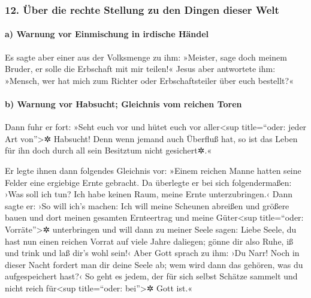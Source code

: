 \hypertarget{uxfcber-die-rechte-stellung-zu-den-dingen-dieser-welt}{%
\subsubsection{12. Über die rechte Stellung zu den Dingen dieser
Welt}\label{uxfcber-die-rechte-stellung-zu-den-dingen-dieser-welt}}

\hypertarget{a-warnung-vor-einmischung-in-irdische-huxe4ndel}{%
\paragraph{a) Warnung vor Einmischung in irdische
Händel}\label{a-warnung-vor-einmischung-in-irdische-huxe4ndel}}

 Es sagte aber einer aus der Volksmenge zu ihm: »Meister,
sage doch meinem Bruder, er solle die Erbschaft mit mir teilen!«
 Jesus aber antwortete ihm: »Mensch, wer hat mich zum
Richter oder Erbschaftsteiler über euch bestellt?«

\hypertarget{b-warnung-vor-habsucht-gleichnis-vom-reichen-toren}{%
\paragraph{b) Warnung vor Habsucht; Gleichnis vom reichen
Toren}\label{b-warnung-vor-habsucht-gleichnis-vom-reichen-toren}}

 Dann fuhr er fort: »Seht euch vor und hütet euch vor
aller\textless sup title=``oder: jeder Art von''\textgreater✲ Habsucht!
Denn wenn jemand auch Überfluß hat, so ist das Leben für ihn doch durch
all sein Besitztum nicht gesichert✲.«

 Er legte ihnen dann folgendes Gleichnis vor: »Einem
reichen Manne hatten seine Felder eine ergiebige Ernte gebracht.
 Da überlegte er bei sich folgendermaßen: ›Was soll ich
tun? Ich habe keinen Raum, meine Ernte unterzubringen.‹ 
Dann sagte er: ›So will ich's machen: Ich will meine Scheunen abreißen
und größere bauen und dort meinen gesamten Ernteertrag und meine
Güter\textless sup title=``oder: Vorräte''\textgreater✲ unterbringen
 und will dann zu meiner Seele sagen: Liebe Seele, du
hast nun einen reichen Vorrat auf viele Jahre daliegen; gönne dir also
Ruhe, iß und trink und laß dir's wohl sein!‹  Aber Gott
sprach zu ihm: ›Du Narr! Noch in dieser Nacht fordert man dir deine
Seele ab; wem wird dann das gehören, was du aufgespeichert hast?‹
 So geht es jedem, der für sich selbst Schätze sammelt
und nicht reich für\textless sup title=``oder: bei''\textgreater✲ Gott
ist.«

